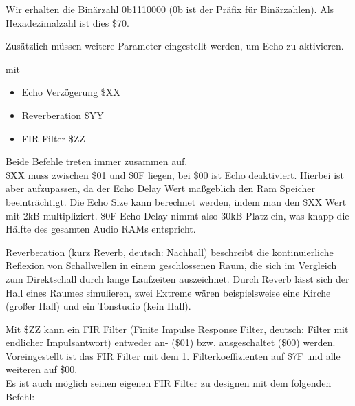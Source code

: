 Wir erhalten die Binärzahl 0b1110000 (0b ist der Präfix für Binärzahlen). Als Hexadezimalzahl ist dies \$70.

\bigskip

Zusätzlich müssen weitere Parameter eingestellt werden, um Echo zu aktivieren.

\medskip



\medskip

mit

\begin{itemize}
	\item Echo Verzögerung \$XX
	\item Reverberation \$YY
	\item FIR Filter \$ZZ
\end{itemize}

Beide Befehle treten immer zusammen auf. \\

\$XX muss zwischen \$01 und \$0F liegen, bei \$00 ist Echo deaktiviert. Hierbei ist aber aufzupassen, da der Echo Delay Wert maßgeblich den Ram Speicher beeinträchtigt. Die Echo Size kann berechnet werden, indem man den \$XX Wert mit 2kB multipliziert. \$0F Echo Delay nimmt also 30kB Platz ein, was knapp die Hälfte des gesamten Audio RAMs entspricht.

\bigskip

Reverberation (kurz Reverb, deutsch: Nachhall) beschreibt die kontinuierliche Reflexion von Schallwellen in einem geschlossenen Raum, die sich im Vergleich zum Direktschall durch lange Laufzeiten auszeichnet. Durch Reverb lässt sich der Hall eines Raumes simulieren, zwei Extreme wären beispielsweise eine Kirche (großer Hall) und ein Tonstudio (kein Hall).

\bigskip

Mit \$ZZ kann ein FIR Filter (Finite Impulse Response Filter, deutsch: Filter mit endlicher Impulsantwort) entweder an- (\$01) bzw. ausgeschaltet (\$00) werden. Voreingestellt ist das FIR Filter mit dem 1. Filterkoeffizienten auf \$7F und alle weiteren auf \$00. \\
Es ist auch möglich seinen eigenen FIR Filter zu designen mit dem folgenden Befehl:

\medskip



